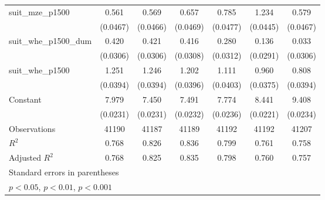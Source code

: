 {\begin{tabular}{l*{6}{c}}
\addlinespace
suit\_mze\_p1500      &       0.561\sym{***}&       0.569\sym{***}&       0.657\sym{***}&       0.785\sym{***}&       1.234\sym{***}&       0.579\sym{***}\\
                    &    (0.0467)         &    (0.0466)         &    (0.0469)         &    (0.0477)         &    (0.0445)         &    (0.0467)         \\
\addlinespace
suit\_whe\_p1500\_dum  &       0.420\sym{***}&       0.421\sym{***}&       0.416\sym{***}&       0.280\sym{***}&       0.136\sym{***}&       0.033         \\
                    &    (0.0306)         &    (0.0306)         &    (0.0308)         &    (0.0312)         &    (0.0291)         &    (0.0306)         \\
\addlinespace
suit\_whe\_p1500      &       1.251\sym{***}&       1.246\sym{***}&       1.202\sym{***}&       1.111\sym{***}&       0.960\sym{***}&       0.808\sym{***}\\
                    &    (0.0394)         &    (0.0394)         &    (0.0396)         &    (0.0403)         &    (0.0375)         &    (0.0394)         \\
\addlinespace
Constant            &       7.979\sym{***}&       7.450\sym{***}&       7.491\sym{***}&       7.774\sym{***}&       8.441\sym{***}&       9.408\sym{***}\\
                    &    (0.0231)         &    (0.0231)         &    (0.0232)         &    (0.0236)         &    (0.0221)         &    (0.0234)         \\
\midrule
Observations        &       41190         &       41187         &       41189         &       41192         &       41192         &       41207         \\
\(R^{2}\)           &       0.768         &       0.826         &       0.836         &       0.799         &       0.761         &       0.758         \\
Adjusted \(R^{2}\)  &       0.768         &       0.825         &       0.835         &       0.798         &       0.760         &       0.757         \\
\bottomrule
\multicolumn{7}{l}{\footnotesize Standard errors in parentheses}\\
\multicolumn{7}{l}{\footnotesize \sym{*} \(p<0.05\), \sym{**} \(p<0.01\), \sym{***} \(p<0.001\)}\\
\end{tabular}
}
